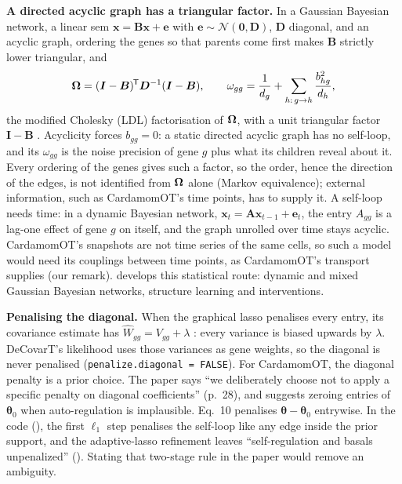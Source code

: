 \documentclass[11pt,a4paper]{article}
\begin{document}
\textbf{A directed acyclic graph has a triangular factor.} In a Gaussian Bayesian network, a linear
\gls{sem} $\bm x=\bm B\bm x+\bm e$ with $\bm e\sim\mathcal N(\bm 0,\bm D)$, $\bm D$ diagonal, and an acyclic
graph, ordering the genes so that parents come first makes $\bm B$ strictly lower triangular, and
\begin{equation}\label{eq:dag-chol}
\bm{\Omega}=(\bm I-\bm B)^{\mkern-1.5mu\mathsf{T}}\bm D^{-1}(\bm I-\bm B),\qquad
\omega_{gg}=\frac1{d_g}+\sum_{h:\,g\to h}\frac{b_{hg}^2}{d_h},
\end{equation}
the modified Cholesky (LDL) factorisation of $\bm{\Omega}$, with a unit triangular factor $\bm I-\bm B$
 \parencite{pourahmadiJointMeancovarianceModels1999}. Acyclicity forces $b_{gg}=0$: a static
directed acyclic graph has no self-loop, and its $\omega_{gg}$ is the noise precision of gene $g$ plus what its
children reveal about it. Every ordering of the genes gives such a factor, so the order, hence the
direction of the edges, is not identified from $\bm{\Omega}$ alone (Markov equivalence); external information,
such as CardamomOT's time points, has to supply it. A self-loop needs time: in a dynamic Bayesian network,
$\bm x_{t}=\bm A\bm x_{t-1}+\bm e_{t}$, the entry $A_{gg}$ is a lag-one effect of gene $g$ on itself, and the
graph unrolled over time stays acyclic. CardamomOT's snapshots are not time series of the same cells, so
such a model would need its couplings between time points, as CardamomOT's transport supplies (our remark).  develops this statistical route: dynamic and mixed Gaussian Bayesian networks,
structure learning and interventions.

\textbf{Penalising the diagonal.} When the graphical lasso penalises every entry, its covariance estimate
has $\hat W_{gg}=V_{gg}+\lambda$ \parencite{friedmanSparseInverseCovariance2008}: every variance is biased
upwards by $\lambda$. DeCovarT's likelihood uses those variances as gene weights, so the diagonal is
never penalised (\texttt{penalize.diagonal = FALSE}). For CardamomOT, the diagonal penalty is a prior
choice. The paper says \enquote{we deliberately choose not to apply a specific penalty on diagonal
coefficients} (p.~28), and suggests zeroing entries of $\bm\theta_0$ when auto-regulation is implausible.
Eq.~10 penalises $\bm\theta-\bm\theta_0$ entrywise. In the code (), the first
$\ell_1$ step penalises the self-loop like any edge inside the prior support, and the adaptive-lasso
refinement leaves \enquote{self-regulation and basals unpenalized} (). Stating
that two-stage rule in the paper would remove an ambiguity.
\end{document}
